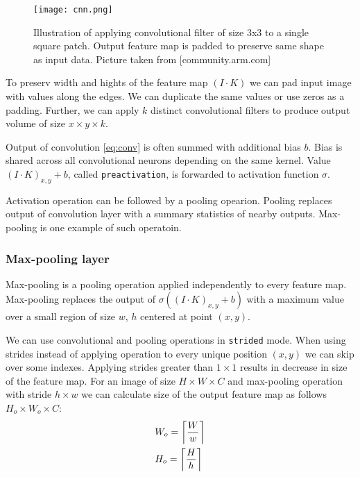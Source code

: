 \begin{figure}
  \texttt{[image: cnn.png]}
  \caption{Illustration of applying convolutional filter of size 3x3 to a single square patch. Output feature map is padded to preserve same shape as input data. Picture taken from [community.arm.com]}
  \label{fig:cnn}
\end{figure}

To preserv width and hights of the feature map $(I \cdot K)$ we can pad input image with values along the edges. We can duplicate the same values or use zeros as a padding.
Further, we can apply $k$ distinct convolutional filters to produce output volume of size $x \times y \times k$.

Output of convolution \ref{eq:conv} is often summed with additional bias $b$.
Bias is shared across all convolutional neurons depending on the same kernel.
Value $(I \cdot K)_{x, y}+b$, called \texttt{preactivation}, is forwarded to activation function $\sigma$.

Activation operation can be followed by a pooling opearion.
Pooling replaces output of convolution layer with a summary statistics of nearby outputs.
Max-pooling is one example of such operatoin.

\subsubsection{Max-pooling layer}

Max-pooling is a pooling operation applied independently to every feature map.
Max-pooling replaces the output of $\sigma((I \cdot K)_{x, y}+b)$ with a maximum value over a small region of size $w$, $h$ centered at point $(x,y)$.

We can use convolutional and pooling operations in \texttt{strided} mode. When using strides instead of applying operation to every unique position $(x, y)$ we can skip over some indexes. Applying strides greater than $1 \times 1$ results in decrease in size of the feature map. For an image of size $H \times W \times C$ and max-pooling operation with stride $h \times w$ we can calculate size of the output feature map as follows $H_o \times W_o \times C $:
\begin{equation*}
  \begin{aligned}
  & W_o = \ceil[\bigg]{\frac{W}{w}} \\
  & H_o = \ceil[\bigg]{\frac{H}{h}} \\
\end{aligned}
\end{equation*}

